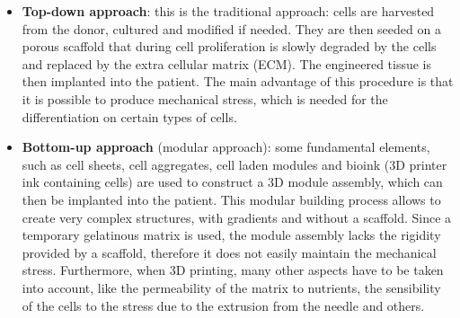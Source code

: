 \begin{multicols}{2}
  \begin{itemize}
    \item \textbf{Top-down approach}: this is the traditional approach: cells are harvested from the donor, cultured and modified if needed.
      They are then seeded on a porous scaffold that during cell proliferation is slowly degraded by the cells and replaced by the extra cellular matrix (ECM).
      The engineered tissue is then implanted into the patient.
      The main advantage of this procedure is that it is possible to produce mechanical stress, which is needed for the differentiation on certain types of cells.
    \item \textbf{Bottom-up approach} (modular approach): some fundamental elements, such as cell sheets, cell aggregates, cell laden modules and bioink (3D printer ink containing cells) are used to construct a 3D module assembly, which can then be implanted into the patient.
      This modular building process allows to create very complex structures, with gradients and without a scaffold.
      Since a temporary gelatinous matrix is used, the module assembly lacks the rigidity provided by a scaffold, therefore it does not easily maintain the mechanical stress.
      Furthermore, when 3D printing, many other aspects have to be taken into account, like the permeability of the matrix to nutrients, the sensibility of the cells to the stress due to the extrusion from the needle and others.
  \end{itemize}
\end{multicols}
